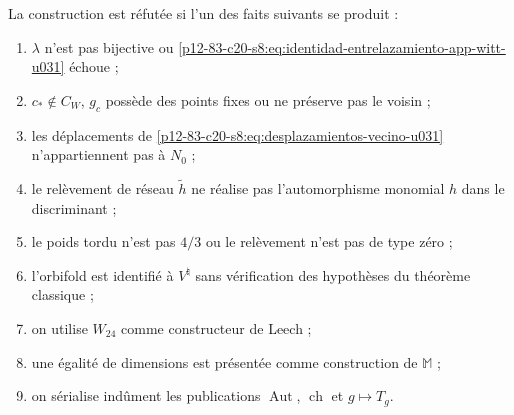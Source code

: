 \begin{criterion}
\label{p12-83-c20-s8:crit:refutacion-corredor-lunar-u031}
La construction est réfutée si l'un des faits suivants se produit :
\begin{enumerate}
 \item \(\lambda\) n'est pas bijective ou
       \eqref{p12-83-c20-s8:eq:identidad-entrelazamiento-app-witt-u031} échoue ;
 \item \(c_*\notin C_W\), \(g_c\) possède des points fixes ou ne préserve pas le
       voisin ;
 \item les déplacements de
       \eqref{p12-83-c20-s8:eq:desplazamientos-vecino-u031} n'appartiennent pas à \(N_0\) ;
 \item le relèvement de réseau \(\widetilde h\) ne réalise pas l'automorphisme
       monomial \(h\) dans le discriminant ;
 \item le poids tordu n'est pas \(4/3\) ou le relèvement n'est pas de type zéro ;
 \item l'orbifold est identifié à \(V^\natural\) sans vérification des
       hypothèses du théorème classique ;
 \item on utilise \(W_{24}\) comme constructeur de Leech ;
 \item une égalité de dimensions est présentée comme construction de
       \(\mathbb M\) ;
 \item on sérialise indûment les publications
       \(\operatorname{Aut}\), \(\operatorname{ch}\) et \(g\mapsto T_g\).
\end{enumerate}
\end{criterion}
